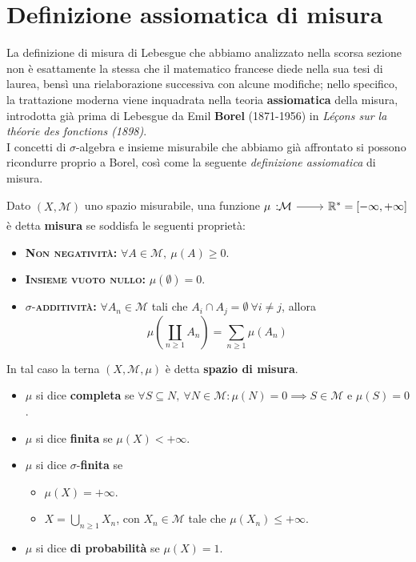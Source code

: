 \section{Definizione assiomatica di misura}
La definizione di misura di Lebesgue che abbiamo analizzato nella scorsa sezione non è esattamente la stessa che il matematico francese diede nella sua tesi di laurea, bensì una rielaborazione successiva con alcune modifiche; nello specifico, la trattazione moderna viene inquadrata nella teoria \textbf{assiomatica} della misura, introdotta già prima di Lebesgue da Emil \textbf{Borel} (1871-1956) in \textit{Léçons sur la théorie des fonctions (1898)}.\\
I concetti di $\sigma$-algebra e insieme misurabile che abbiamo già affrontato si possono ricondurre proprio a Borel, così come la seguente \textit{definizione assiomatica} di misura.
\begin{define}
	Dato $\left(X,\mathcal{M}\right)$ uno spazio misurabile, una funzione $\funz{\mu}{\mathcal{M}}{\realset^{\ast}=\left[-\infty,+\infty\right]}$ è detta \textbf{misura} se soddisfa le seguenti proprietà:
	\begin{itemize}
		\item \textsc{\textbf{Non negatività:}} $\forall A\in\mathcal{M},\ \mu\left(A\right)\geq 0$.
		\item \textsc{\textbf{Insieme vuoto nullo:}} $\mu\left(\emptyset\right)=0$.
		\item $\sigma$-\textsc{\textbf{additività:}} $\forall A_n\in\mathcal{M}$ tali che $A_i\cap A_j=\emptyset\ \forall i\neq j$, allora
		\begin{equation}
			\mu\left(\coprod_{n\geq 1}A_n\right)=\sum_{n\geq 1}\mu\left(A_n\right)
		\end{equation}
	\end{itemize}
	In tal caso la terna $\left(X,\mathcal{M},\mu\right)$ è detta \textbf{spazio di misura}.
	\begin{itemize}
		\item $\mu$ si dice \textbf{completa} se $\forall S\subseteq N,\ \forall N\in\mathcal{M}\colon\mu(N)=0\implies S\in\mathcal{M}$ e $\mu(S)=0$.
		\item $\mu$ si dice \textbf{finita} se $\mu(X)<+\infty$.
		\item $\mu$ si dice $\sigma$-\textbf{finita} se
		\begin{itemize}
			\item $\mu(X)=+\infty$.
			\item $\displaystyle X=\bigcup_{n\geq 1}X_n$, con $X_n\in\mathcal{M}$ tale che $\mu\left(X_n\right)\leq +\infty$.
		\end{itemize}
	\item $\mu$ si dice \textbf{di probabilità} se $\mu(X)=1$.
	\end{itemize}
\end{define}
